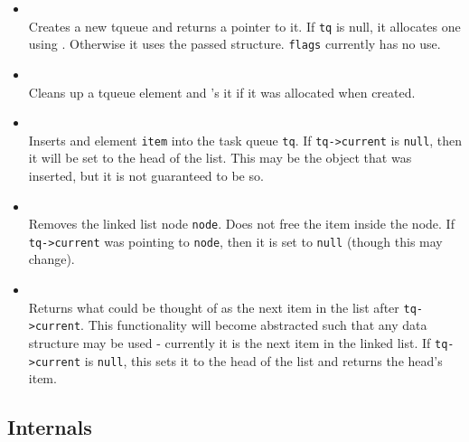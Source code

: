 \begin{itemize}
\item {} \\
Creates a new tqueue and returns a pointer to it. If \texttt{tq} is null, it allocates
one using . Otherwise it uses the passed structure. \texttt{flags} currently has no use.

\item {} \\
Cleans up a tqueue element and 's it if it was allocated when created.

\item {} \\
Inserts and element \texttt{item} into the task queue \texttt{tq}. If \texttt{tq->current} is \texttt{null},
then it will be set to the head of the list. This may be the object that was inserted, but it is not
guaranteed to be so.

\item {} \\
Removes the linked list node \texttt{node}. Does not free the item inside the node. If \texttt{tq->current}
was pointing to \texttt{node}, then it is set to \texttt{null} (though this may change).

\item {} \\
Returns what could be thought of as the next item in the list after \texttt{tq->current}. This 
functionality will become abstracted such that any data structure may be used - currently it
is the next item in the linked list. If \texttt{tq->current} is \texttt{null}, this sets it to
the head of the list and returns the head's item.

\end{itemize}
\subsection{Internals}

